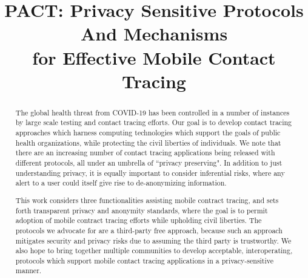 \documentclass{article}
\title{{\Huge PACT\/}:   {\Huge P\/}rivacy Sensitive Protocols {\Huge A\/}nd Mechanisms
\\for Effective Mobile {\Huge C\/}ontact {\Huge T\/}racing }
\date{}
\begin{document}
\maketitle

\begin{abstract}
The global health threat from COVID-19 has been controlled in a number of instances by large scale testing and contact tracing efforts.
Our goal is to develop contact tracing approaches which harness computing technologies which support the goals of public health organizations, while protecting the civil liberties of individuals.  We note that there are an increasing number of contact tracing applications being released with different protocols, all under an umbrella of  ``privacy preserving".  In addition to just understanding privacy, it is equally important to consider inferential risks, where any alert to a user could itself give rise to de-anonymizing information.  


This work considers three functionalities assisting mobile contract tracing, and sets forth transparent privacy and anonymity standards,
where the goal is to permit adoption of mobile contract tracing efforts while upholding civil liberties.  The protocols we advocate for are a third-party free approach, because such an approach mitigates security and privacy risks due to assuming the third party is trustworthy. We also 
hope to bring together multiple communities to develop acceptable, interoperating, protocols which support mobile contact tracing applications in a privacy-sensitive manner.
\end{abstract}
\end{document}
